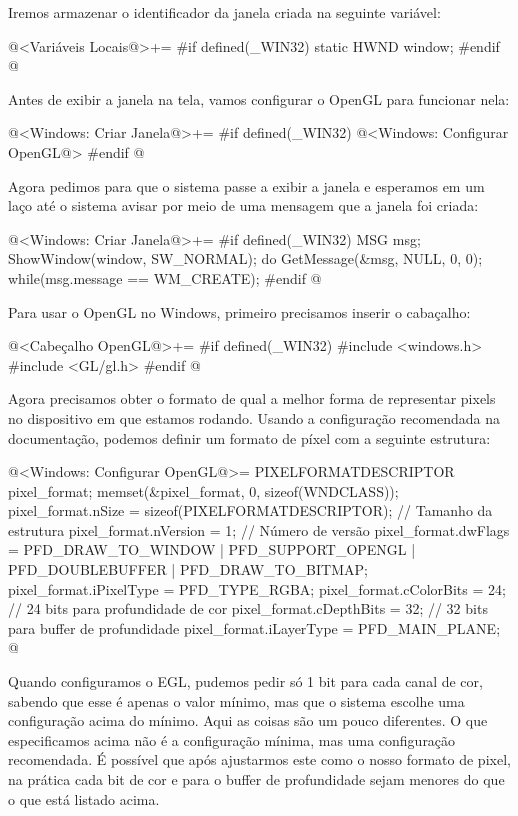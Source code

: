 Iremos armazenar o identificador da janela criada na seguinte
variável:

\iniciocodigo
@<Variáveis Locais@>+=
#if defined(_WIN32)
static HWND window;
#endif
@
\fimcodigo

Antes de exibir a janela na tela, vamos configurar o OpenGL para
funcionar nela:

\iniciocodigo
@<Windows: Criar Janela@>+=
#if defined(_WIN32)
@<Windows: Configurar OpenGL@>
#endif
@
\fimcodigo

Agora pedimos para que o sistema passe a exibir a janela e esperamos
em um laço até o sistema avisar por meio de uma mensagem que a janela
foi criada:

\iniciocodigo
@<Windows: Criar Janela@>+=
#if defined(_WIN32)
{
  MSG msg;
  ShowWindow(window, SW_NORMAL);
  do{
    GetMessage(&msg, NULL, 0, 0);
  } while(msg.message == WM_CREATE);
}
#endif
@
\fimcodigo


Para usar o OpenGL no Windows, primeiro precisamos inserir o
cabaçalho:

\iniciocodigo
@<Cabeçalho OpenGL@>+=
#if defined(_WIN32)
#include <windows.h>
#include <GL/gl.h>
#endif
@
\fimcodigo

Agora precisamos obter o formato de qual a melhor forma de representar
pixels no dispositivo em que estamos rodando. Usando a configuração
recomendada na documentação, podemos definir um formato de píxel com a
seguinte estrutura:

\iniciocodigo
@<Windows: Configurar OpenGL@>=
PIXELFORMATDESCRIPTOR pixel_format;
memset(&pixel_format, 0, sizeof(WNDCLASS));
pixel_format.nSize = sizeof(PIXELFORMATDESCRIPTOR); // Tamanho da estrutura
pixel_format.nVersion = 1; // Número de versão
pixel_format.dwFlags = PFD_DRAW_TO_WINDOW | PFD_SUPPORT_OPENGL |
                       PFD_DOUBLEBUFFER | PFD_DRAW_TO_BITMAP;
pixel_format.iPixelType = PFD_TYPE_RGBA;
pixel_format.cColorBits = 24; // 24 bits para profundidade de cor
pixel_format.cDepthBits = 32; // 32 bits para buffer de profundidade
pixel_format.iLayerType = PFD_MAIN_PLANE;
@
\fimcodigo

Quando configuramos o EGL, pudemos pedir só 1 bit para cada canal de
cor, sabendo que esse é apenas o valor mínimo, mas que o sistema
escolhe uma configuração acima do mínimo. Aqui as coisas são um pouco
diferentes. O que especificamos acima não é a configuração mínima, mas
uma configuração recomendada. É possível que após ajustarmos este como
o nosso formato de pixel, na prática cada bit de cor e para o buffer
de profundidade sejam menores do que o que está listado acima.


